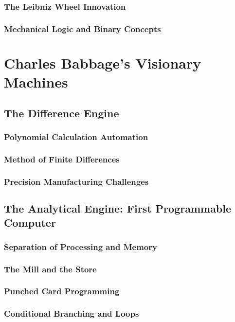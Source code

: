 \documentclass[12pt, oneside, openany]{book}
\begin{document}
\subsubsection{The Leibniz Wheel Innovation}
\subsubsection{Mechanical Logic and Binary Concepts}

\section{Charles Babbage's Visionary Machines}
\subsection{The Difference Engine}
\subsubsection{Polynomial Calculation Automation}
\subsubsection{Method of Finite Differences}
\subsubsection{Precision Manufacturing Challenges}

\subsection{The Analytical Engine: First Programmable Computer}
\subsubsection{Separation of Processing and Memory}
\subsubsection{The Mill and the Store}
\subsubsection{Punched Card Programming}
\subsubsection{Conditional Branching and Loops}
\end{document}

